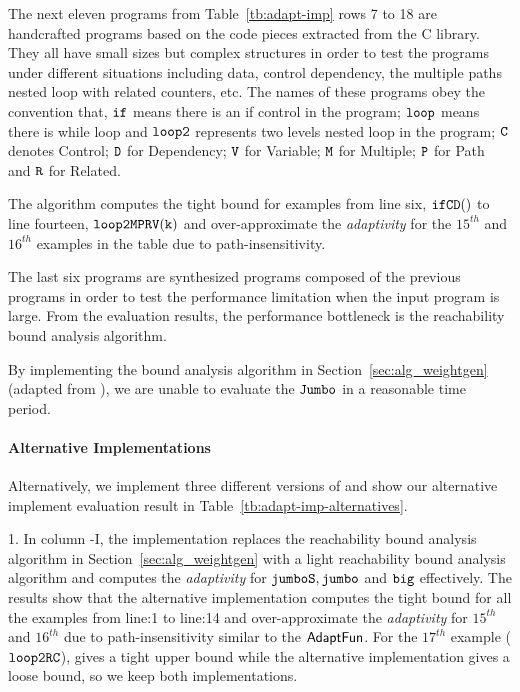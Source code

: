 The next eleven programs from Table~\ref{tb:adapt-imp} rows 7 to 18 are handcrafted programs based on the code pieces extracted from the C library. They all have small sizes but complex structures in order to test the programs under different situations including
data, control dependency,
the multiple paths nested loop with related counters, etc.
The names of these programs obey the convention that,
$\mathtt{if}$ means there is an if control in the program;
$\mathtt{loop}$ means there is while loop and $\mathtt{loop2}$ represents two levels nested loop in the program;
$\mathtt{C}$ denotes Control;
$\mathtt{D}$ for Dependency; $\mathtt{V}$ for Variable;
$\mathtt{M}$ for Multiple; $\mathtt{P}$ for Path and $\mathtt{R}$ for Related.


The algorithm computes the tight bound for examples from line six, $\mathtt{ifCD()}$ to line fourteen, $\mathtt{loop2MPRV(k)}$
and over-approximate the \emph{adaptivity} for the $15^{th}$ and $16^{th}$ examples in the table due to path-insensitivity.

The last six programs are synthesized programs composed of the previous programs in order to test the performance limitation when the input program is large. 
From the evaluation results, the performance bottleneck is the reachability bound analysis algorithm.


By implementing the bound analysis algorithm in Section~\ref{sec:alg_weightgen} (adapted from \cite{SinnZV17}), we are unable to evaluate the $\mathtt{Jumbo}$ in a reasonable time period.

\paragraph{Alternative Implementations}

Alternatively, we implement three different versions of {\THESYSTEM} and show our alternative implement evaluation result in Table~\ref{tb:adapt-imp-alternatives}.
 
1. In column {\THESYSTEM}-I, the implementation replaces the reachability bound analysis algorithm in Section~\ref{sec:alg_weightgen} with a light reachability bound analysis algorithm and computes the \emph{adaptivity} for
$\mathtt{jumboS}, \mathtt{jumbo}$ and $\mathtt{big}$ effectively.
The results show that the alternative implementation computes the tight bound for all the examples from line:1 to line:14
and over-approximate the \emph{adaptivity} for $15^{th}$ and $16^{th}$ due to path-insensitivity similar to the
$\textsf{AdaptFun}$.
For the $17^{th}$ example ($\mathtt{loop2RC}$), {\THESYSTEM} gives a tight upper bound while the alternative implementation gives a loose bound, so we keep both implementations.

